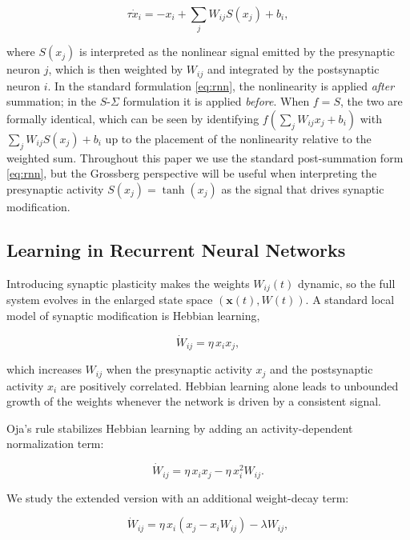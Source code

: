 \documentclass[paper=a4, fontsize=11pt]{scrartcl} %
\numberwithin{equation}{section} %
\numberwithin{figure}{section} %
\numberwithin{table}{section} %
\begin{document}
\begin{equation}
    \tau \dot{x}_i = -x_i + \sum_j W_{ij} S(x_j) + b_i,
\end{equation}

where $S(x_j)$ is interpreted as the nonlinear signal emitted by the presynaptic
neuron $j$, which is then weighted by $W_{ij}$ and integrated by the postsynaptic
neuron $i$.  In the standard formulation \eqref{eq:rnn}, the nonlinearity is applied
\emph{after} summation; in the $S$-$\Sigma$ formulation it is applied \emph{before}.
When $f = S$, the two are formally identical, which can be seen by identifying
$f(\sum_j W_{ij} x_j + b_i)$ with $\sum_j W_{ij} S(x_j) + b_i$ up to the
placement of the nonlinearity relative to the weighted sum.  Throughout this paper
we use the standard post-summation form \eqref{eq:rnn}, but the Grossberg
perspective will be useful when interpreting the presynaptic activity $S(x_j) =
\tanh(x_j)$ as the signal that drives synaptic modification.

\subsection{Learning in Recurrent Neural Networks}

Introducing synaptic plasticity makes the weights $W_{ij}(t)$ dynamic, so the
full system evolves in the enlarged state space $(\mathbf{x}(t), W(t))$.  A
standard local model of synaptic modification is Hebbian learning,

\begin{equation}
    \dot{W}_{ij} = \eta\, x_i x_j,
\end{equation}

which increases $W_{ij}$ when the presynaptic activity $x_j$ and the postsynaptic
activity $x_i$ are positively correlated.  Hebbian learning alone leads to
unbounded growth of the weights whenever the network is driven by a consistent
signal.

Oja's rule \cite{sompolinsky1988chaos} stabilizes Hebbian learning by adding an
activity-dependent normalization term:

\begin{equation}
    \dot{W}_{ij} = \eta\, x_i x_j - \eta\, x_i^2 W_{ij}.
\end{equation}

We study the extended version with an additional weight-decay term:

\begin{equation}
    \dot{W}_{ij} = \eta\, x_i(x_j - x_i W_{ij}) - \lambda W_{ij},
    \label{eq:oja}
\end{equation}
\end{document}
